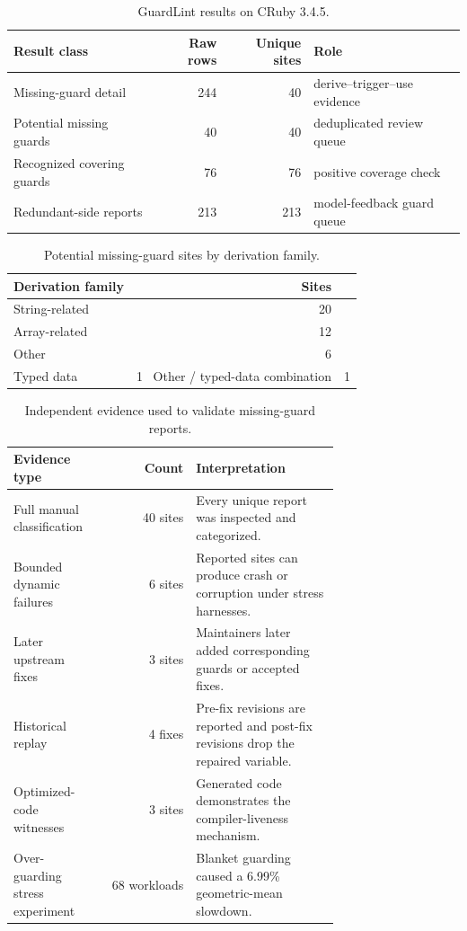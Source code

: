 
\begin{table}[t]
\caption{GuardLint results on CRuby 3.4.5.}
\label{tab:result-overview}
\centering
\scriptsize
\begin{tabular}{@{}lrrl@{}}
\toprule
Result class & Raw rows & Unique sites & Role \\
\midrule
Missing-guard detail & 244 & 40 & derive--trigger--use evidence \\
Potential missing guards & 40 & 40 & deduplicated review queue \\
Recognized covering guards & 76 & 76 & positive coverage check \\
Redundant-side reports & 213 & 213 & model-feedback guard queue \\
\bottomrule
\end{tabular}
\end{table}

\begin{table}[t]
\caption{Potential missing-guard sites by derivation family.}
\label{tab:derivation-families}
\centering
\scriptsize
\begin{tabular}{@{}lr@{}}
\toprule
Derivation family & Sites \\
\midrule
String-related & 20 \\
Array-related & 12 \\
Other & 6 \\
Typed data & 1 \
Other / typed-data combination & 1 \\
\bottomrule
\end{tabular}
\end{table}

\begin{table}[t]
\caption{Independent evidence used to validate missing-guard reports.}
\label{tab:evidence-matrix}
\centering
\scriptsize
\begin{tabular}{@{}p{0.28\linewidth}rp{0.44\linewidth}@{}}
\toprule
Evidence type & Count & Interpretation \\
\midrule
Full manual classification & 40 sites & Every unique report was inspected and categorized. \\
Bounded dynamic failures & 6 sites & Reported sites can produce crash or corruption under stress harnesses. \\
Later upstream fixes & 3 sites & Maintainers later added corresponding guards or accepted fixes. \\
Historical replay & 4 fixes & Pre-fix revisions are reported and post-fix revisions drop the repaired variable. \\
Optimized-code witnesses & 3 sites & Generated code demonstrates the compiler-liveness mechanism. \\
Over-guarding stress experiment & 68 workloads & Blanket guarding caused a 6.99\% geometric-mean slowdown. \\
\bottomrule
\end{tabular}
\end{table}


